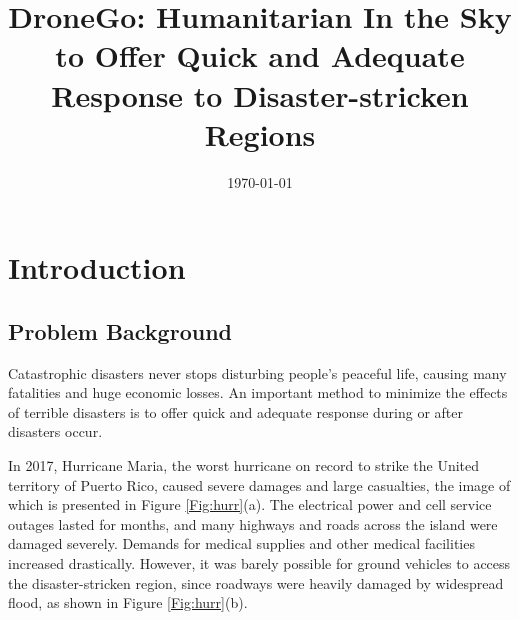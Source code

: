 \documentclass{mcmthesis}
\begin{document}
\linespread{0.6} %
\setlength{\parskip}{0.5\baselineskip} %
\title{DroneGo: Humanitarian In the Sky to Offer Quick and Adequate Response to Disaster-stricken Regions}

\date{\today}
	\begin{abstract}

	
		\begin{keywords}
		
		\end{keywords}
	\end{abstract}

\maketitle

\tableofcontents

\newpage

\section{Introduction}

\subsection{Problem Background}

Catastrophic disasters never stops disturbing people's peaceful life, causing many fatalities and huge economic losses. An important method to minimize the effects of terrible disasters is to offer quick and adequate response during or after disasters occur. 

In 2017, Hurricane Maria, the worst hurricane on record to strike the United territory of Puerto Rico, caused severe damages and large casualties, the image of which is presented in Figure \ref{Fig:hurr}(a). The electrical power and cell service outages lasted for months, and many highways and roads across the island were damaged severely. Demands for medical supplies and other medical facilities increased drastically. However, it was barely possible for ground vehicles to access the disaster-stricken region, since roadways were heavily damaged by widespread flood, as shown in Figure \ref{Fig:hurr}(b).
\end{document}
